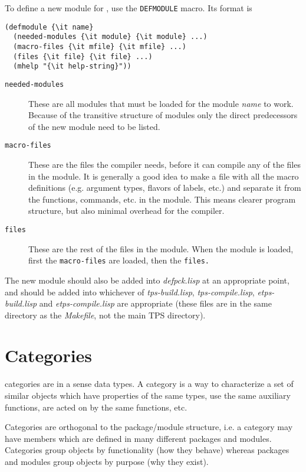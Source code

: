 To define a new module for \tps, use the {\tt DEFMODULE} macro.
Its format is

\begin{verbatim}
(defmodule {\it name}
  (needed-modules {\it module} {\it module} ...)
  (macro-files {\it mfile} {\it mfile} ...)
  (files {\it file} {\it file} ...)
  (mhelp "{\it help-string}"))
\end{verbatim}

\begin{description}
\item [{\tt needed-modules}] These are all modules that must be loaded for the
module {\it name} to work.  Because of the transitive structure of modules
only the direct predecessors of the new module need to be listed.

\item [{\tt macro-files}] These are the files the compiler needs, before it can
compile any of the files in the module.  It is generally a good idea
to make a file with all the macro definitions (e.g. argument types,
flavors of labels, etc.) and separate it from the functions, commands,
etc. in the module.  This means clearer program structure, but also
minimal overhead for the compiler.

\item [{\tt files}] These are the rest of the files in the module.  When the module
is loaded, first the {\tt macro-files} are loaded, then the {\tt files.}
\end{description}

The new module should also be added into {\it defpck.lisp} at an appropriate point, and 
should be added into whichever of {\it tps-build.lisp}, {\it tps-compile.lisp},
{\it etps-build.lisp} and {\it etps-compile.lisp} are appropriate (these files are in the
same directory as the {\it Makefile}, not the main TPS directory).

\section{Categories}
\label{categories}

\TPS categories are in a sense data types. A category is a way to characterize a set of similar
objects which have properties of the same types, use the same auxiliary functions, are acted on 
by the same functions, etc.

Categories are orthogonal to the package/module structure, i.e. a category may have members which are 
defined in many different packages and modules. Categories group objects by functionality 
(how they behave) whereas packages and modules group objects by purpose (why they exist).

